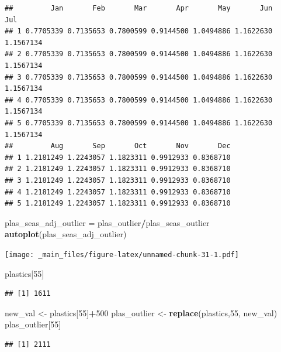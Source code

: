 \documentclass[]{book}
\newenvironment{Shaded}{\begin{snugshade}}{\end{snugshade}}
\newcommand{\DecValTok}[1]{\textcolor[rgb]{0.00,0.00,0.81}{#1}}
\newcommand{\KeywordTok}[1]{\textcolor[rgb]{0.13,0.29,0.53}{\textbf{#1}}}
\newcommand{\NormalTok}[1]{#1}
\newcommand{\OperatorTok}[1]{\textcolor[rgb]{0.81,0.36,0.00}{\textbf{#1}}}
\newcommand{\StringTok}[1]{\textcolor[rgb]{0.31,0.60,0.02}{#1}}
\begin{document}
\begin{verbatim}
##         Jan       Feb       Mar       Apr       May       Jun       Jul
## 1 0.7705339 0.7135653 0.7800599 0.9144500 1.0494886 1.1622630 1.1567134
## 2 0.7705339 0.7135653 0.7800599 0.9144500 1.0494886 1.1622630 1.1567134
## 3 0.7705339 0.7135653 0.7800599 0.9144500 1.0494886 1.1622630 1.1567134
## 4 0.7705339 0.7135653 0.7800599 0.9144500 1.0494886 1.1622630 1.1567134
## 5 0.7705339 0.7135653 0.7800599 0.9144500 1.0494886 1.1622630 1.1567134
##         Aug       Sep       Oct       Nov       Dec
## 1 1.2181249 1.2243057 1.1823311 0.9912933 0.8368710
## 2 1.2181249 1.2243057 1.1823311 0.9912933 0.8368710
## 3 1.2181249 1.2243057 1.1823311 0.9912933 0.8368710
## 4 1.2181249 1.2243057 1.1823311 0.9912933 0.8368710
## 5 1.2181249 1.2243057 1.1823311 0.9912933 0.8368710
\end{verbatim}

\begin{Shaded}
\begin{Highlighting}[]
\NormalTok{plas_seas_adj_outlier =}\StringTok{ }\NormalTok{plas_outlier}\OperatorTok{/}\NormalTok{plas_seas_outlier}
\KeywordTok{autoplot}\NormalTok{(plas_seas_adj_outlier)}
\end{Highlighting}
\end{Shaded}

\texttt{[image: \_main\_files/figure-latex/unnamed-chunk-31-1.pdf]}

\begin{Shaded}
\begin{Highlighting}[]
\NormalTok{plastics[}\DecValTok{55}\NormalTok{]}
\end{Highlighting}
\end{Shaded}

\begin{verbatim}
## [1] 1611
\end{verbatim}

\begin{Shaded}
\begin{Highlighting}[]
\NormalTok{new_val <-}\StringTok{ }\NormalTok{plastics[}\DecValTok{55}\NormalTok{]}\OperatorTok{+}\DecValTok{500}
\NormalTok{plas_outlier <-}\StringTok{ }\KeywordTok{replace}\NormalTok{(plastics,}\DecValTok{55}\NormalTok{, new_val)}
\NormalTok{plas_outlier[}\DecValTok{55}\NormalTok{]}
\end{Highlighting}
\end{Shaded}

\begin{verbatim}
## [1] 2111
\end{verbatim}
\end{document}
